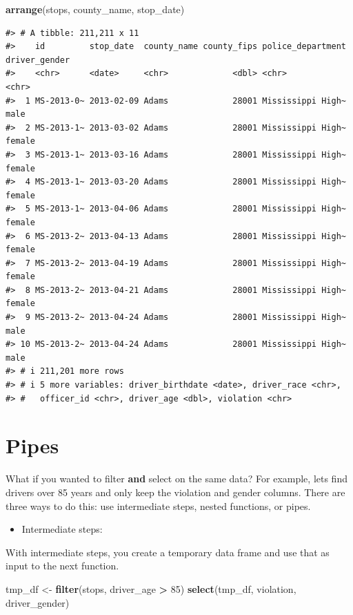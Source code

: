 \documentclass[
]{book}
\newenvironment{Shaded}{\begin{snugshade}}{\end{snugshade}}
\newcommand{\DecValTok}[1]{\textcolor[rgb]{0.00,0.00,0.81}{#1}}
\newcommand{\FunctionTok}[1]{\textcolor[rgb]{0.13,0.29,0.53}{\textbf{#1}}}
\newcommand{\NormalTok}[1]{#1}
\newcommand{\OtherTok}[1]{\textcolor[rgb]{0.56,0.35,0.01}{#1}}
\newcommand{\SpecialCharTok}[1]{\textcolor[rgb]{0.81,0.36,0.00}{\textbf{#1}}}
\providecommand{\tightlist}{%
  \setlength{\itemsep}{0pt}\setlength{\parskip}{0pt}}
\begin{document}
\begin{Shaded}
\begin{Highlighting}[]
\FunctionTok{arrange}\NormalTok{(stops, county\_name, stop\_date)}
\end{Highlighting}
\end{Shaded}

\begin{verbatim}
#> # A tibble: 211,211 x 11
#>    id         stop_date  county_name county_fips police_department driver_gender
#>    <chr>      <date>     <chr>             <dbl> <chr>             <chr>        
#>  1 MS-2013-0~ 2013-02-09 Adams             28001 Mississippi High~ male         
#>  2 MS-2013-1~ 2013-03-02 Adams             28001 Mississippi High~ female       
#>  3 MS-2013-1~ 2013-03-16 Adams             28001 Mississippi High~ female       
#>  4 MS-2013-1~ 2013-03-20 Adams             28001 Mississippi High~ female       
#>  5 MS-2013-1~ 2013-04-06 Adams             28001 Mississippi High~ female       
#>  6 MS-2013-2~ 2013-04-13 Adams             28001 Mississippi High~ female       
#>  7 MS-2013-2~ 2013-04-19 Adams             28001 Mississippi High~ female       
#>  8 MS-2013-2~ 2013-04-21 Adams             28001 Mississippi High~ female       
#>  9 MS-2013-2~ 2013-04-24 Adams             28001 Mississippi High~ male         
#> 10 MS-2013-2~ 2013-04-24 Adams             28001 Mississippi High~ male         
#> # i 211,201 more rows
#> # i 5 more variables: driver_birthdate <date>, driver_race <chr>,
#> #   officer_id <chr>, driver_age <dbl>, violation <chr>
\end{verbatim}

\hypertarget{pipes}{%
\section{Pipes}\label{pipes}}

What if you wanted to filter \textbf{and} select on the same data? For example, lets find drivers over 85 years and only keep the violation and gender columns. There are three ways to do this: use intermediate steps, nested functions, or pipes.

\begin{itemize}
\tightlist
\item
  Intermediate steps:
\end{itemize}

With intermediate steps, you create a temporary data frame and use
that as input to the next function.

\begin{Shaded}
\begin{Highlighting}[]
\NormalTok{tmp\_df }\OtherTok{\textless{}{-}} \FunctionTok{filter}\NormalTok{(stops, driver\_age }\SpecialCharTok{\textgreater{}} \DecValTok{85}\NormalTok{)}
\FunctionTok{select}\NormalTok{(tmp\_df, violation, driver\_gender)}
\end{Highlighting}
\end{Shaded}
\end{document}
